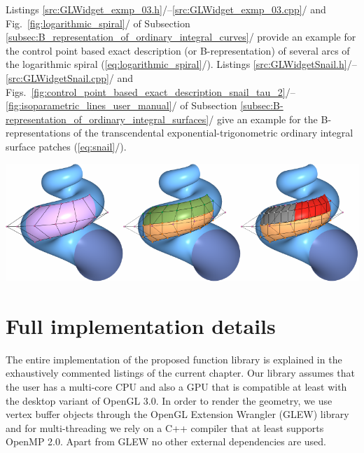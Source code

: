 \documentclass[b5paper, twosided]{book}
\newcommand{\CRed}[1]{{\color[rgb]{0.5, 0.0, 0.0}{#1}}}
\newcommand{\LinkColor}[1]{{\color[rgb]{0.65,0.0,0.0}{#1}}}
\DeclareRobustCommand{\mref}[1]{\ref{#1}{\relsize{-1}/\pageref{#1}}}
\begin{document}
\noindent{}\CRed{\textbf{Examples to consider.}} Listings \mref{src:GLWidget_exmp_03.h}--\mref{src:GLWidget_exmp_03.cpp} and Fig.\ \mref{fig:logarithmic_spiral} of Subsection \mref{subsec:B_representation_of_ordinary_integral_curves} provide an example for the control point based exact description (or B-representation) of several arcs of the logarithmic spiral (\mref{eq:logarithmic_spiral}). Listings \mref{src:GLWidgetSnail.h}--\mref{src:GLWidgetSnail.cpp} and Figs.\ 
\mref{fig:control_point_based_exact_description_snail_tau_2}-- \mref{fig:isoparametric_lines_user_manual} of Subsection \mref{subsec:B-representation_of_ordinary_integral_surfaces} give an example for the B-representations of the transcendental exponential-trigonometric ordinary integral surface patches (\mref{eq:snail}).

\begin{savequote}[\goldenratio\textwidth]
	\sffamily
	\footnotesize
	{
		\begin{flushright}
			\includegraphics[width = \textwidth]{images/full_implementation_details.pdf}
		\end{flushright}
		\LinkColor{Exceptions $\bullet$ Smart pointers  $\bullet$ Cartesian, homogeneous and texture coordinates  $\bullet$  Colors, lights, materials  $\bullet$ Different template and specialized matrices $\bullet$  Constants and utility functions $\bullet$ Shader programs  $\bullet$ Generic curves and simple triangle meshes  $\bullet$  Abstract linear combinations and tensor product surfaces  $\bullet$ Characteristic polynomials, EC spaces, B-curves and B-surfaces}
	}
\end{savequote}

\chapter{Full implementation details}\label{ch:Full_implementation_details}

The entire implementation of the proposed function library is explained in the exhaustively commented listings of the current chapter.  Our library assumes that the user has a multi-core CPU and also a GPU that is compatible at least with the desktop variant of OpenGL 3.0. In order to render the geometry, we use vertex buffer objects through the OpenGL Extension Wrangler (GLEW) library and for multi-threading we rely on a C++ compiler that at least supports OpenMP 2.0. Apart from GLEW no other external dependencies are used. 
\end{document}
